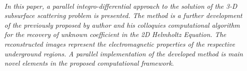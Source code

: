 \begin{multicols}{2}
      \\\\
      \\
      \\\\
\\
    \textit{In this paper, a parallel integro-differential approach to
the solution of the 3-D subsurface scattering problem is presented. The method is a
further development of the previously proposed by author and his colloquies
computational algorithm for the recovery of unknown coefficient in the
2D Helmholtz Equation. The reconstructed images represent the electromagnetic properties of the respective underground regions. A parallel implementation of the developed method is main novel elements in the proposed computational
framework.}\\
\\ 
      \\
      \\\\
\\
  \end{multicols}

